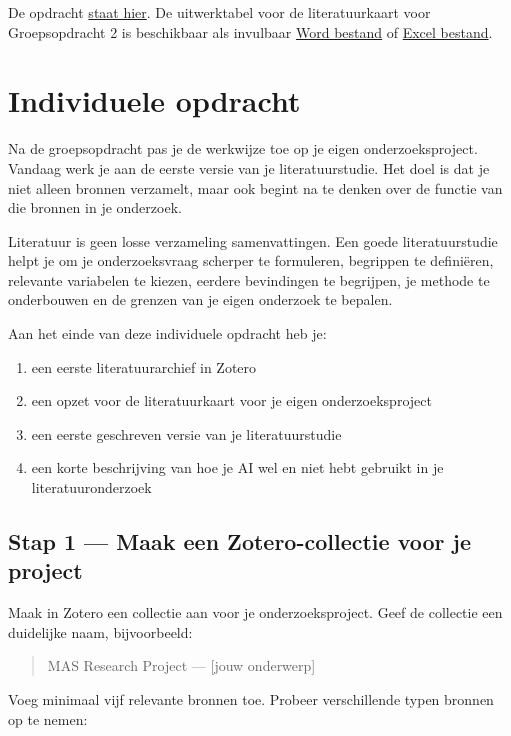 \documentclass[
  letterpaper,
  DIV=11,
  numbers=noendperiod]{scrreprt}
\providecommand{\tightlist}{%
  \setlength{\itemsep}{0pt}\setlength{\parskip}{0pt}}
\begin{document}
De opdracht \href{opdracht/groepsopdracht2.html}{staat hier}. De
uitwerktabel voor de literatuurkaart voor Groepsopdracht 2 is
beschikbaar als invulbaar \href{}{Word bestand} of \href{}{Excel
bestand}.

\section{Individuele opdracht}\label{individuele-opdracht-1}

Na de groepsopdracht pas je de werkwijze toe op je eigen
onderzoeksproject. Vandaag werk je aan de eerste versie van je
literatuurstudie. Het doel is dat je niet alleen bronnen verzamelt, maar
ook begint na te denken over de functie van die bronnen in je onderzoek.

Literatuur is geen losse verzameling samenvattingen. Een goede
literatuurstudie helpt je om je onderzoeksvraag scherper te formuleren,
begrippen te definiëren, relevante variabelen te kiezen, eerdere
bevindingen te begrijpen, je methode te onderbouwen en de grenzen van je
eigen onderzoek te bepalen.

Aan het einde van deze individuele opdracht heb je:

\begin{enumerate}
\def\labelenumi{\arabic{enumi}.}
\tightlist
\item
  een eerste literatuurarchief in Zotero
\item
  een opzet voor de literatuurkaart voor je eigen onderzoeksproject
\item
  een eerste geschreven versie van je literatuurstudie
\item
  een korte beschrijving van hoe je AI wel en niet hebt gebruikt in je
  literatuuronderzoek
\end{enumerate}

\subsection{Stap 1 --- Maak een Zotero-collectie voor je
project}\label{stap-1-maak-een-zotero-collectie-voor-je-project}

Maak in Zotero een collectie aan voor je onderzoeksproject. Geef de
collectie een duidelijke naam, bijvoorbeeld:

\begin{quote}
MAS Research Project --- {[}jouw onderwerp{]}
\end{quote}

Voeg minimaal vijf relevante bronnen toe. Probeer verschillende typen
bronnen op te nemen:
\end{document}
